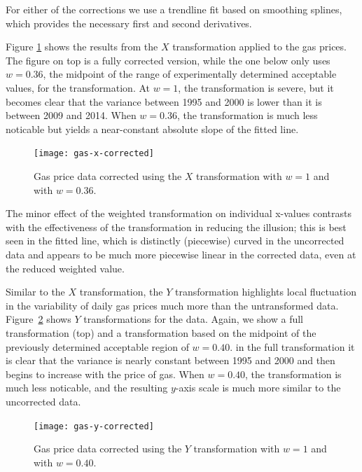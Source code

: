 \documentclass[11pt]{isuthesis}\usepackage[]{graphicx}\usepackage[]{color}
\begin{document}
For either of the corrections we use a trendline fit based on smoothing splines, which provides the necessary first and second derivatives.




Figure \ref{fig:gasprices-x-correct} shows the results from the $X$ transformation applied to the gas prices. The figure on top is a fully corrected version, while the one below only uses $w=0.36$, the midpoint of the range of experimentally determined acceptable values,  for the transformation. At $w=1$, the transformation is severe, but it becomes clear that the variance between 1995 and 2000 is lower than it is between 2009 and 2014. When $w=0.36$, the transformation is much less noticable but yields a near-constant absolute slope of the fitted line.

\begin{figure}
\centering
\texttt{[image: gas-x-corrected]}
\caption[Gas price data, X transformation]{Gas price data corrected using the $X$ transformation with $w=1$ and with $w=0.36$. }
\label{fig:gasprices-x-correct}
\end{figure}
The minor effect of the weighted transformation on individual x-values contrasts with the effectiveness of the transformation in reducing the illusion; this is best seen in the fitted line, which is distinctly (piecewise) curved in the uncorrected data and appears to be much more piecewise linear in the corrected data, even at the reduced weighted value. 

Similar to the $X$ transformation, the $Y$ transformation highlights local fluctuation in the variability of daily gas prices much more than the untransformed data. Figure~\ref{fig:gasprices-y-correct} shows $Y$ transformations for the data. Again, we show a full transformation (top) and a transformation based on the midpoint of the previously determined acceptable region of $w=0.40$.
in the full transformation  it is clear that the variance is nearly constant between 1995 and 2000 and then begins to increase with the price of gas. When $w=0.40$, the transformation is much less noticable, and the resulting $y$-axis scale is much more similar to the uncorrected data. 

\begin{figure}[h]
\centering
\texttt{[image: gas-y-corrected]}
\caption[Gas price data, Y transformation]{Gas price data corrected using the $Y$ transformation with $w=1$ and with $w=0.40$. }
\label{fig:gasprices-y-correct}
\end{figure}
\end{document}

